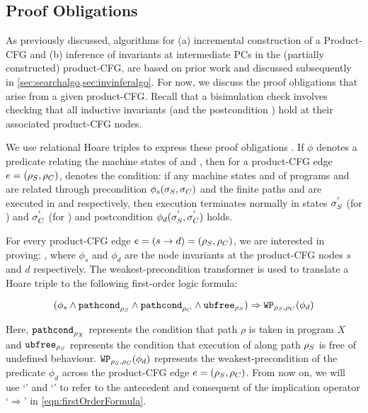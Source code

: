\subsection{Proof Obligations}
\label{sec:proofobl}
As previously discussed, algorithms for (a) incremental construction of a Product-CFG
and (b) inference of invariants at intermediate PCs in the (partially constructed) product-CFG, are
based on prior work\cite{oopsla20} and discussed subsequently in \cref{sec:searchalgo,sec:invinferalgo}.
For now, we discuss the proof obligations that arise from a given product-CFG.
Recall that a bisimulation check involves checking that all inductive invariants
(and the postcondition \post{}) hold at their associated product-CFG nodes.

We use relational Hoare triples to express these proof obligations \cite{relationalHoareLogic,hoareTriple}.
If $\phi$ denotes a predicate relating the machine states of \sprog{} and \cprog{}, then
for a product-CFG edge $e=({\tt \rho}_{S},{\tt \rho}_{C})$, 
denotes the condition:
if any machine states \sv{\sigma} and \cv{\sigma} of programs \sprog{} and \cprog{} are related through
precondition $\phi_s({\tt \sigma}_{S},{\tt \sigma}_{C})$ and the finite paths \sv{\rho} and \cv{\rho}
are executed in \sprog{} and \cprog{} respectively,
then execution terminates normally in states ${\tt \sigma}_{S}^{'}$ (for \sprog{}) and
${\tt \sigma}_{C}^{'}$ (for \cprog{}) and postcondition $\phi_d({\tt \sigma}_{S}^{'},{\tt \sigma}_{C}^{'})$ holds.

For every product-CFG edge $e = (s \rightarrow d) = ({\tt \rho}_{S}, {\tt \rho}_{C})$,
we are interested in proving: ,
where $\phi_s$ and $\phi_d$ are the node invariants at the product-CFG nodes $s$ and $d$
respectively.
The weakest-precondition transformer is used to translate a Hoare triple
 to the following
first-order logic formula:

\begin{equation}
\label{eqn:firstOrderFormula}
(\phi_s \land {\tt pathcond}_{{\tt \rho}_{S}} \land {\tt pathcond}_{{\tt \rho}_{C}} \land {\tt ubfree}_{{\tt \rho}_{S}}) \Rightarrow {\tt WP}_{{{\tt \rho}_{S},{\tt \rho}_{C}}}(\phi_d)
\end{equation}

Here, ${\tt pathcond}_{\rho_X}$ represents the condition that path $\rho$ is taken in program $X$
and ${\tt ubfree}_{{\tt \rho}_{S}}$ represents the condition that execution of \sprog{} along path ${\tt \rho}_{S}$
is free of undefined behaviour.
${\tt WP}_{{{\tt \rho}_{S},{\tt \rho}_{C}}}(\phi_d)$ represents the weakest-precondition
of the predicate $\phi_d$ across the product-CFG edge $e = ({\tt \rho}_{S},{\tt \rho}_{C})$.
From now on, we will use `\lhs{}' and `\rhs{}' to refer to the antecedent and consequent of
the implication operator `$\Rightarrow$' in \cref{eqn:firstOrderFormula}.

